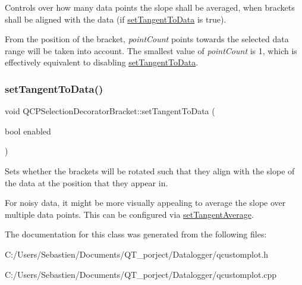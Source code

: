 Controls over how many data points the slope shall be averaged, when brackets shall be aligned with the data (if \hyperlink{class_q_c_p_selection_decorator_bracket_a93bc6086e53a5e40a08641a7b2e2cdd5}{set\+Tangent\+To\+Data} is true).

From the position of the bracket, {\itshape point\+Count} points towards the selected data range will be taken into account. The smallest value of {\itshape point\+Count} is 1, which is effectively equivalent to disabling \hyperlink{class_q_c_p_selection_decorator_bracket_a93bc6086e53a5e40a08641a7b2e2cdd5}{set\+Tangent\+To\+Data}. \mbox{\label{class_q_c_p_selection_decorator_bracket_a93bc6086e53a5e40a08641a7b2e2cdd5}} 
\subsubsection{\texorpdfstring{set\+Tangent\+To\+Data()}{setTangentToData()}}
{\footnotesize\ttfamily void Q\+C\+P\+Selection\+Decorator\+Bracket\+::set\+Tangent\+To\+Data (\begin{DoxyParamCaption}\item[{bool}]{enabled }\end{DoxyParamCaption})}

Sets whether the brackets will be rotated such that they align with the slope of the data at the position that they appear in.

For noisy data, it might be more visually appealing to average the slope over multiple data points. This can be configured via \hyperlink{class_q_c_p_selection_decorator_bracket_adb2d0876f25a77c88042b70818f1d6e4}{set\+Tangent\+Average}. 

The documentation for this class was generated from the following files\+:\begin{DoxyCompactItemize}
\item 
C\+:/\+Users/\+Sebastien/\+Documents/\+Q\+T\+\_\+porject/\+Datalogger/qcustomplot.\+h\item 
C\+:/\+Users/\+Sebastien/\+Documents/\+Q\+T\+\_\+porject/\+Datalogger/qcustomplot.\+cpp\end{DoxyCompactItemize}
